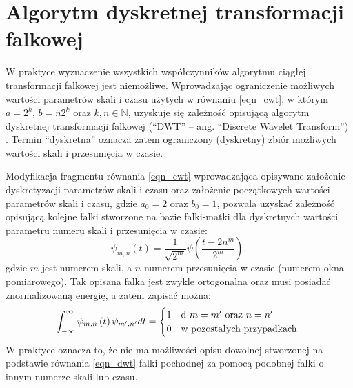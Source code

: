 \section{Algorytm dyskretnej transformacji falkowej}

W praktyce wyznaczenie wszystkich współczynników algorytmu ciągłej transformacji falkowej jest niemożliwe. Wprowadzając ograniczenie możliwych wartości parametrów skali i czasu użytych w równaniu \eqref{eqn_cwt}, w którym $a = 2^k$, $b = n2^k$ oraz $k, n \in \mathbb{N}$, uzyskuje się zależność opisującą algorytm dyskretnej transformacji falkowej (\enquote{DWT} -- ang. \enquote{Discrete Wavelet Transform}) \cite{wallen_handbook}. Termin \enquote{dyskretna} oznacza zatem ograniczony (dyskretny) zbiór możliwych wartości skali i przesunięcia w czasie.

Modyfikacja fragmentu równania \eqref{eqn_cwt} wprowadzająca opisywane założenie dyskretyzacji parametrów skali i czasu oraz założenie początkowych wartości parametrów skali i czasu, gdzie $a_{0} = 2$ oraz $b_{0} = 1$, pozwala uzyskać zależność opisującą kolejne falki stworzone na bazie falki-matki dla dyskretnych wartości parametru numeru skali i przesunięcia w czasie:
\begin{equation}
\psi_{m,n} \left( t \right) = \frac{1}{\sqrt{2^{m}}} \psi \left( \frac{t-2n^{m}}{2^{m}} \right) \label{eqn_dwt_wavelet},
\end{equation}
gdzie $m$ jest numerem skali, a $n$ numerem przesunięcia w czasie (numerem okna pomiarowego). Tak opisana falka jest zwykle ortogonalna oraz musi posiadać znormalizowaną energię, a zatem zapisać można:
\begin{equation}
\int _{-\infty} ^{\infty} \psi_{m,n} \left( t \right) \psi_{m',n'} dt =
\begin{cases}
	1 & $d $ m = m' $ oraz $ n = n' \\
	0 & $w pozostałych przypadkach$
\end{cases}
\label{eqn_dwt_orthogonal}.
\end{equation}
W praktyce oznacza to, że nie ma możliwości opisu dowolnej stworzonej na podstawie równania \eqref{eqn_dwt} falki pochodnej za pomocą podobnej falki o innym numerze skali lub czasu.


